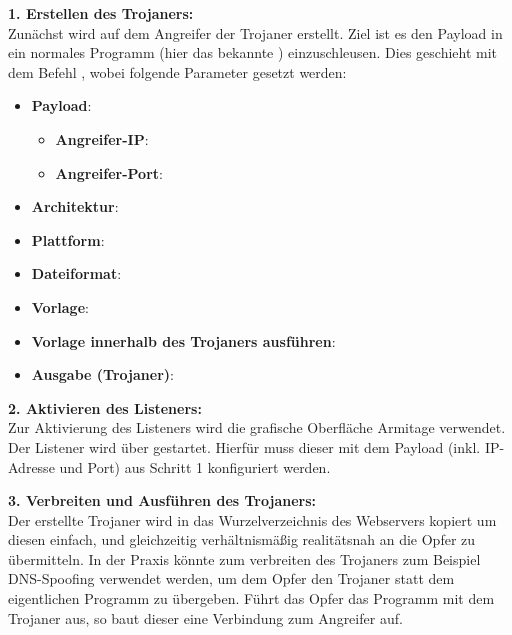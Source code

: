 \textbf{1. Erstellen des Trojaners: } \hfill \\
Zunächst wird auf dem Angreifer der Trojaner erstellt.
Ziel ist es den Payload  in ein normales Programm (hier das bekannte ) einzuschleusen. 
Dies geschieht mit dem Befehl  \cite{OSMSFV}, wobei folgende Parameter gesetzt werden:
\begin{itemize}
	\item \textbf{Payload}: \\
	      \begin{itemize}
		      \item  \textbf{Angreifer-IP}: 
		      \item \textbf{Angreifer-Port}: 
		  \end{itemize}
	\item \textbf{Architektur}: 
	\item \textbf{Plattform}: 
	\item \textbf{Dateiformat}: 
	\item \textbf{Vorlage}: 
	\item \textbf{Vorlage innerhalb des Trojaners ausführen}: 
	\item \textbf{Ausgabe (Trojaner)}: 
\end{itemize}

\bigskip
\textbf{2. Aktivieren des Listeners: } \hfill \\
Zur Aktivierung des Listeners wird die grafische Oberfläche Armitage verwendet.
Der Listener wird über  gestartet.
Hierfür muss dieser mit dem Payload (inkl. IP-Adresse und Port) aus Schritt 1 konfiguriert werden.

\bigskip
\textbf{3. Verbreiten und Ausführen des Trojaners: }\hfill \\
Der erstellte Trojaner wird in das Wurzelverzeichnis des Webservers  kopiert um diesen einfach, und gleichzeitig verhältnismäßig realitätsnah an die Opfer zu übermitteln.
In der Praxis könnte zum verbreiten des Trojaners zum Beispiel DNS-Spoofing verwendet werden, um dem Opfer den Trojaner statt dem eigentlichen Programm zu übergeben.
Führt das Opfer das Programm mit dem Trojaner aus, so baut dieser eine Verbindung zum Angreifer auf. 

